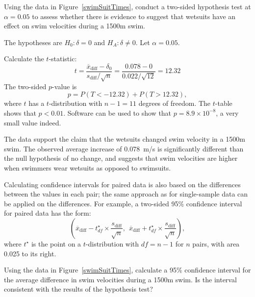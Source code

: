 \begin{examplewrap}
\begin{nexample}{Using the data in Figure~\ref{swimSuitTimes}, conduct a two-sided hypothesis test at $\alpha = 0.05$ to assess whether there is evidence to suggest that wetsuits have an effect on swim velocities during a 1500m swim.}

The hypotheses are $H_0: \delta = 0$ and $H_A: \delta \neq 0$. Let $\alpha = 0.05$. 

Calculate the $t$-statistic:
\[t = \frac{\overline{x}_{\text{diff}} - \delta_0} {s_{\text{diff}}/\sqrt{n}} = \frac{0.078 - 0}{0.022/\sqrt{12}} = 12.32\]
The two-sided $p$-value is
$$ p = P(T < -\text{12.32}) + P(T > \text{12.32}), $$
where $t$ has a $t$-distribution with $n-1 = 11$  degrees of freedom.
The $t$-table shows that $p < 0.01$. Software can be used to show that $p = 8.9 \times 10^{-8}$, a very small value indeed.  
	
The data support the claim that the wetsuits changed swim velocity in a 1500m swim. The observed average increase of 0.078~m/s is significantly different than the null hypothesis of no change, and suggests that swim velocities are higher when swimmers wear wetsuits as opposed to swimsuits.	
\end{nexample}
\end{examplewrap}


Calculating confidence intervals for paired data is also based on the differences between the values in each pair; the same approach as for single-sample data can be applied on the differences. For example, a two-sided 95\% confidence interval for paired data has the form:
\[ \left(
  \overline{x}_{\text{diff}} - t^\star_{df} \times \frac{s_{\text{diff}}}{\sqrt{n}},
  \:\: \overline{x}_{\text{diff}} + t^\star_{df} \times \frac{s_{\text{diff}}}{\sqrt{n}} \right), 
\]
where $t^\star$ is the point on a $t$-distribution with $df = n - 1$ for $n$ pairs, with area 0.025 to its right.

\textD{\newpage}

\begin{exercisewrap}
\begin{nexercise} 
Using the data in Figure~\ref{swimSuitTimes}, calculate a 95\% confidence interval for the average difference in swim velocities during a 1500m swim. Is the interval consistent with the results of the hypothesis test?\footnotemark{}
\end{nexercise}
\end{exercisewrap}

